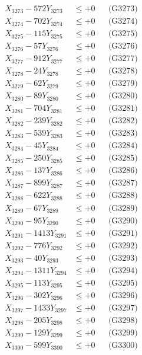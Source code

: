 \documentclass[a4paper,10pt]{article}
\begin{document}
{\begin{align}
X_{3273} - 572Y_{3273} &\leq +0 && \text{(G3273)} \\
X_{3274} - 702Y_{3274} &\leq +0 && \text{(G3274)} \\
X_{3275} - 115Y_{3275} &\leq +0 && \text{(G3275)} \\
X_{3276} - 57Y_{3276} &\leq +0 && \text{(G3276)} \\
X_{3277} - 912Y_{3277} &\leq +0 && \text{(G3277)} \\
X_{3278} - 24Y_{3278} &\leq +0 && \text{(G3278)} \\
X_{3279} - 62Y_{3279} &\leq +0 && \text{(G3279)} \\
X_{3280} - 89Y_{3280} &\leq +0 && \text{(G3280)} \\
\allowbreak
X_{3281} - 704Y_{3281} &\leq +0 && \text{(G3281)} \\
X_{3282} - 239Y_{3282} &\leq +0 && \text{(G3282)} \\
X_{3283} - 539Y_{3283} &\leq +0 && \text{(G3283)} \\
X_{3284} - 45Y_{3284} &\leq +0 && \text{(G3284)} \\
X_{3285} - 250Y_{3285} &\leq +0 && \text{(G3285)} \\
X_{3286} - 137Y_{3286} &\leq +0 && \text{(G3286)} \\
X_{3287} - 899Y_{3287} &\leq +0 && \text{(G3287)} \\
X_{3288} - 622Y_{3288} &\leq +0 && \text{(G3288)} \\
X_{3289} - 67Y_{3289} &\leq +0 && \text{(G3289)} \\
X_{3290} - 95Y_{3290} &\leq +0 && \text{(G3290)} \\
\allowbreak
X_{3291} - 1413Y_{3291} &\leq +0 && \text{(G3291)} \\
X_{3292} - 776Y_{3292} &\leq +0 && \text{(G3292)} \\
X_{3293} - 40Y_{3293} &\leq +0 && \text{(G3293)} \\
X_{3294} - 1311Y_{3294} &\leq +0 && \text{(G3294)} \\
X_{3295} - 113Y_{3295} &\leq +0 && \text{(G3295)} \\
X_{3296} - 302Y_{3296} &\leq +0 && \text{(G3296)} \\
X_{3297} - 1433Y_{3297} &\leq +0 && \text{(G3297)} \\
X_{3298} - 205Y_{3298} &\leq +0 && \text{(G3298)} \\
X_{3299} - 129Y_{3299} &\leq +0 && \text{(G3299)} \\
X_{3300} - 599Y_{3300} &\leq +0 && \text{(G3300)} \\

\end{align}}
\end{document}
